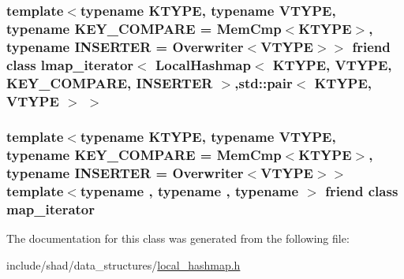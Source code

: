 \hypertarget{classshad_1_1LocalHashmap_a0782f66aa59afb708b15c0ef7782c20d}{
\subsubsection[{lmap\-\_\-iterator$<$ Local\-Hashmap$<$ K\-T\-Y\-P\-E, V\-T\-Y\-P\-E, K\-E\-Y\-\_\-\-C\-O\-M\-P\-A\-R\-E, I\-N\-S\-E\-R\-T\-E\-R $>$, std\-::pair$<$ K\-T\-Y\-P\-E, V\-T\-Y\-P\-E $>$ $>$}]{\setlength{\rightskip}{0pt plus 5cm}template$<$typename K\-T\-Y\-P\-E, typename V\-T\-Y\-P\-E, typename K\-E\-Y\-\_\-\-C\-O\-M\-P\-A\-R\-E = Mem\-Cmp$<$\-K\-T\-Y\-P\-E$>$, typename I\-N\-S\-E\-R\-T\-E\-R = Overwriter$<$\-V\-T\-Y\-P\-E$>$$>$ friend class {\bf lmap\-\_\-iterator}$<$ {\bf Local\-Hashmap}$<$ K\-T\-Y\-P\-E, V\-T\-Y\-P\-E, K\-E\-Y\-\_\-\-C\-O\-M\-P\-A\-R\-E, I\-N\-S\-E\-R\-T\-E\-R $>$,std\-::pair$<$ K\-T\-Y\-P\-E, V\-T\-Y\-P\-E $>$ $>$\hspace{0.3cm}{\ttfamily [friend]}}}\label{classshad_1_1LocalHashmap_a0782f66aa59afb708b15c0ef7782c20d}
\hypertarget{classshad_1_1LocalHashmap_ae4a075e5a8191685a74f2d18b8cd8850}{
\subsubsection[{map\-\_\-iterator}]{\setlength{\rightskip}{0pt plus 5cm}template$<$typename K\-T\-Y\-P\-E, typename V\-T\-Y\-P\-E, typename K\-E\-Y\-\_\-\-C\-O\-M\-P\-A\-R\-E = Mem\-Cmp$<$\-K\-T\-Y\-P\-E$>$, typename I\-N\-S\-E\-R\-T\-E\-R = Overwriter$<$\-V\-T\-Y\-P\-E$>$$>$ template$<$typename , typename , typename $>$ friend class {\bf map\-\_\-iterator}\hspace{0.3cm}{\ttfamily [friend]}}}\label{classshad_1_1LocalHashmap_ae4a075e5a8191685a74f2d18b8cd8850}


The documentation for this class was generated from the following file\-:\begin{DoxyCompactItemize}
\item 
include/shad/data\-\_\-structures/\hyperlink{local__hashmap_8h}{local\-\_\-hashmap.\-h}\end{DoxyCompactItemize}
